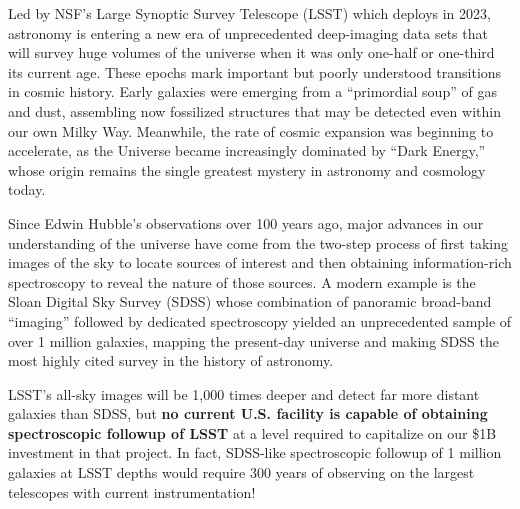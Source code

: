 \documentclass[oneside,11pt]{amsart}
\begin{document}
Led by NSF's Large Synoptic Survey Telescope (LSST) which deploys in 2023, astronomy is entering a new era of
unprecedented deep-imaging data sets that will survey huge volumes of the universe when it was only one-half or
one-third its current age.  These epochs mark important but poorly understood transitions in cosmic history. Early
galaxies were emerging from a ``primordial soup'' of gas and dust, assembling now fossilized structures that may be
detected even within our own Milky Way.  Meanwhile, the rate of cosmic expansion was beginning to accelerate, as the
Universe became increasingly dominated by ``Dark Energy,'' whose origin remains the single greatest mystery in
astronomy and cosmology today.

Since Edwin Hubble's observations over 100 years ago, major advances in our understanding of the universe have come
from the two-step process of first taking images of the sky to locate sources of interest and then obtaining
information-rich spectroscopy to reveal the nature of those sources.  A modern example is the Sloan Digital Sky Survey
(SDSS) whose combination of panoramic broad-band ``imaging'' followed by dedicated spectroscopy yielded an
unprecedented sample of over 1 million galaxies, mapping the present-day universe and making SDSS the most highly cited
survey in the history of astronomy.


LSST's all-sky images will be 1,000 times deeper and detect far more distant galaxies than SDSS, but \textbf{no current
U.S. facility is capable of obtaining spectroscopic followup of LSST} at a level required to capitalize on our \$1B
investment in that project.  In fact, SDSS-like spectroscopic followup of 1 million galaxies at LSST depths would
require 300 years of observing on the largest telescopes with current instrumentation!
\end{document}
